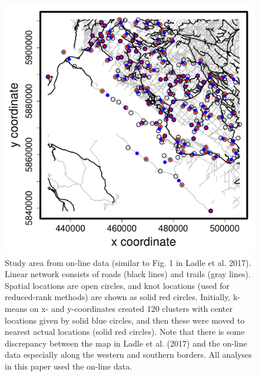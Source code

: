\documentclass[11pt, titlepage]{article}\usepackage[]{graphicx}\usepackage[]{color}
\begin{document}
\begin{spacing}{1.9}
\begin{flushleft}
\begin{singlespace}
	\begin{figure}
	  \centering
	    \includegraphics[width=\linewidth]{figure/Fig-knotLocs-1.pdf}
	  \caption{Study area from on-line data (similar to Fig. 1 in Ladle et al. 2017). Linear network consists of roads (black lines) and trails (gray lines). Spatial locations are open circles, and knot locations (used for reduced-rank methods) are shown as solid red circles.  Initially, k-means on x- and y-coordinates created 120 clusters with center locations given by solid blue circles, and then these were moved to nearest actual locations (solid red circles).  Note that there is some discrepancy between the map in Ladle et al. (2017) and the on-line data especially along the western and southern borders.  All analyses in this paper used the on-line data.}\label{fig:reduRank}
  \end{figure}




\end{singlespace}
\end{flushleft}
\end{spacing}
\end{document}
